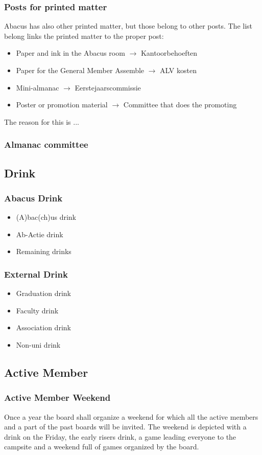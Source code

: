 \documentclass{report}
\begin{document}
\subsubsection{Posts for printed matter}
Abacus has also other printed matter, but those belong to other posts. The list belong links the printed matter to the proper post:
\begin{itemize}
\item Paper and ink in the Abacus room 		$\rightarrow$ Kantoorbehoeften
\item Paper for the General Member Assemble $\rightarrow$ ALV kosten
\item Mini-almanac $\rightarrow$ Eerstejaarscommissie
\item Poster or promotion material $\rightarrow$ Committee that does the promoting
\end{itemize}
The reason for this is ...
\subsubsection{Almanac committee}


\subsection{Drink}
\subsubsection{Abacus Drink}
\begin{itemize}
\item (A)bac(ch)us drink
\item Ab-Actie drink
\item Remaining drinks
\end{itemize}
\subsubsection{External Drink}
\begin{itemize}
\item Graduation drink
\item Faculty drink
\item Association drink
\item Non-uni drink
\end{itemize}
\subsection{Active Member}
\subsubsection{Active Member Weekend}
Once a year the board shall organize a weekend for which all the active members and a part of the past boards will be invited. The weekend is depicted with a drink on the Friday, the early risers drink, a game leading everyone to the campsite and a weekend full of games organized by the board. 
\end{document}
